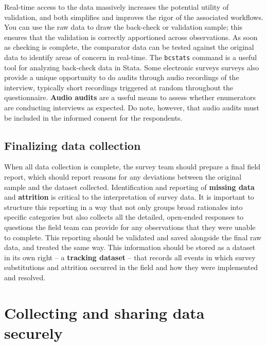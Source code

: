 Real-time access to the data massively increases the potential utility of validation,
and both simplifies and improves the rigor of the associated workflows.
You can use the raw data to draw the back-check or validation sample;
this ensures that the validation is correctly apportioned across observations.
As soon as checking is complete, the comparator data can be tested against
the original data to identify areas of concern in real-time.
The \texttt{bcstats} command is a useful tool for analyzing back-check data in Stata.
Some electronic surveys surveys also provide a unique opportunity
to do audits through audio recordings of the interview,
typically short recordings triggered at random throughout the questionnaire.
\textbf{Audio audits} are a useful means to assess whether enumerators are conducting interviews as expected.
Do note, however, that audio audits must be included in the informed consent for the respondents.

\subsection{Finalizing data collection}

When all data collection is complete, the survey team should prepare a final field report,
which should report reasons for any deviations between the original sample and the dataset collected.
Identification and reporting of \textbf{missing data} and \textbf{attrition}
is critical to the interpretation of survey data.
It is important to structure this reporting in a way that not only
groups broad rationales into specific categories
but also collects all the detailed, open-ended responses
to questions the field team can provide for any observations that they were unable to complete.
This reporting should be validated and saved alongside the final raw data, and treated the same way.
This information should be stored as a dataset in its own right
-- a \textbf{tracking dataset} -- that records all events in which survey substitutions
and attrition occurred in the field and how they were implemented and resolved.

\section{Collecting and sharing data securely}

